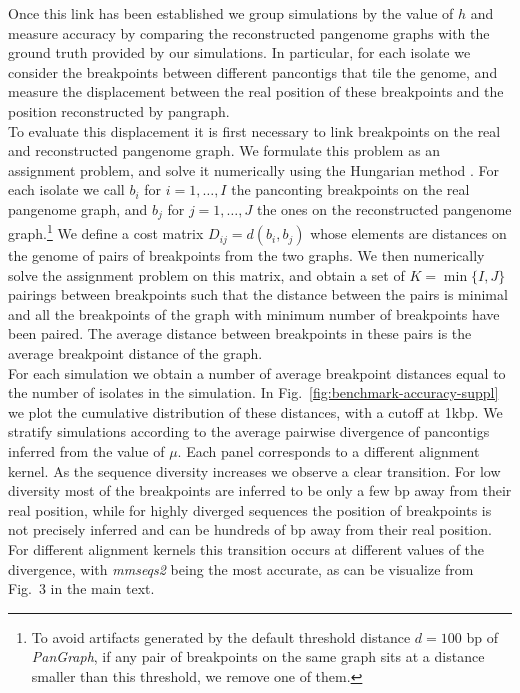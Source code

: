 \documentclass[aps,rmp,reprint,superscriptaddress,notitlepage,10pt,onecolumn]{revtex4-1}
\begin{document}
Once this link has been established we group simulations by the value of $h$ and measure accuracy by comparing the reconstructed pangenome graphs with the ground truth provided by our simulations. In particular, for each isolate we consider the breakpoints between different pancontigs that tile the genome, and measure the displacement between the real position of these breakpoints and the position reconstructed by pangraph.\\
To evaluate this displacement it is first necessary to link breakpoints on the real and reconstructed pangenome graph. We formulate this problem as an assignment problem, and solve it numerically using the Hungarian method \cite{kuhn1955hungarian}. For each isolate we call $b_i$ for $i=1,\ldots,I$ the panconting breakpoints on the real pangenome graph, and $b_j$ for $j=1,\ldots,J$ the ones on the reconstructed pangenome graph.\footnote{To avoid artifacts generated by the default threshold distance $d=100$ bp of
    \textit{PanGraph}, if any pair of breakpoints on the same graph sits at a distance smaller than this threshold, we remove one of them.} We define a cost matrix $D_{ij} = d(b_i,b_j)$ whose elements are distances on the genome of pairs of breakpoints from the two graphs. We then numerically solve the assignment problem on this matrix, and obtain a set of $K = \min\{ I,J \}$ pairings between breakpoints such that the distance between the pairs is minimal and all the breakpoints of the graph with minimum number of breakpoints have been paired. The average distance between breakpoints in these pairs is the average breakpoint distance of the graph.\\
For each simulation we obtain a number of average breakpoint distances equal to the number of isolates in the simulation. In Fig.~\ref{fig:benchmark-accuracy-suppl} we plot the cumulative distribution of these distances, with a cutoff at 1kbp. We stratify simulations according to the average pairwise divergence of pancontigs inferred from the value of $\mu$. Each panel corresponds to a different alignment kernel. As the sequence diversity increases we observe a clear transition. For low diversity most of the breakpoints are inferred to be only a few bp away from their real position, while for highly diverged sequences the position of breakpoints is not precisely inferred and can be hundreds of bp away from their real position. For different alignment kernels this transition occurs at different values of the divergence, with \textit{mmseqs2} being the most accurate, as can be visualize from Fig.~3 in the main text.
\end{document}
